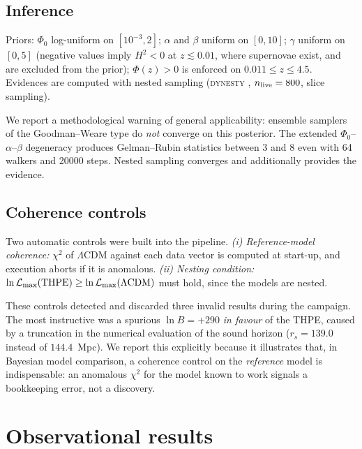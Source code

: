 \documentclass[aps,prd,twocolumn,superscriptaddress,nofootinbib,floatfix]{revtex4-2}
\newcommand{\LCDM}{\ensuremath{\Lambda}CDM}
\begin{document}
\subsection{Inference}

Priors: $\Phi_0$ log-uniform on $[10^{-3},2]$; $\alpha$ and $\beta$
uniform on $[0,10]$; $\gamma$ uniform on $[0,5]$ (negative values imply
$H^2<0$ at $z\lesssim0.01$, where supernovae exist, and are excluded
from the prior); $\Phi(z)>0$ is enforced on $0.011\le z\le4.5$.
Evidences are computed with nested sampling
(\textsc{dynesty} \cite{Speagle2020}, $n_{\rm live}=800$, slice
sampling).

We report a methodological warning of general applicability:
ensemble samplers of the Goodman--Weare type \cite{emcee} do
\emph{not} converge on this posterior. The extended
$\Phi_0$--$\alpha$--$\beta$ degeneracy produces Gelman--Rubin
statistics between 3 and 8 even with 64 walkers and 20000 steps.
Nested sampling converges and additionally provides the evidence.

\subsection{Coherence controls}
\label{sec:controls}

Two automatic controls were built into the pipeline.
\emph{(i) Reference-model coherence:} $\chi^2$ of \LCDM{} against each
data vector is computed at start-up, and execution aborts if it is
anomalous. \emph{(ii) Nesting condition:}
$\ln\mathcal{L}_{\rm max}({\rm THPE})\ge\ln\mathcal{L}_{\rm max}(\Lambda\mathrm{CDM})$
must hold, since the models are nested.

These controls detected and discarded three invalid results during the
campaign. The most instructive was a spurious $\ln B=+290$ \emph{in
favour} of the THPE, caused by a truncation in the numerical evaluation
of the sound horizon ($r_s=139.0$ instead of $144.4$~Mpc). We report
this explicitly because it illustrates that, in Bayesian model
comparison, a coherence control on the \emph{reference} model is
indispensable: an anomalous $\chi^2$ for the model known to work
signals a bookkeeping error, not a discovery.

\section{Observational results}
\label{sec:results}
\end{document}
